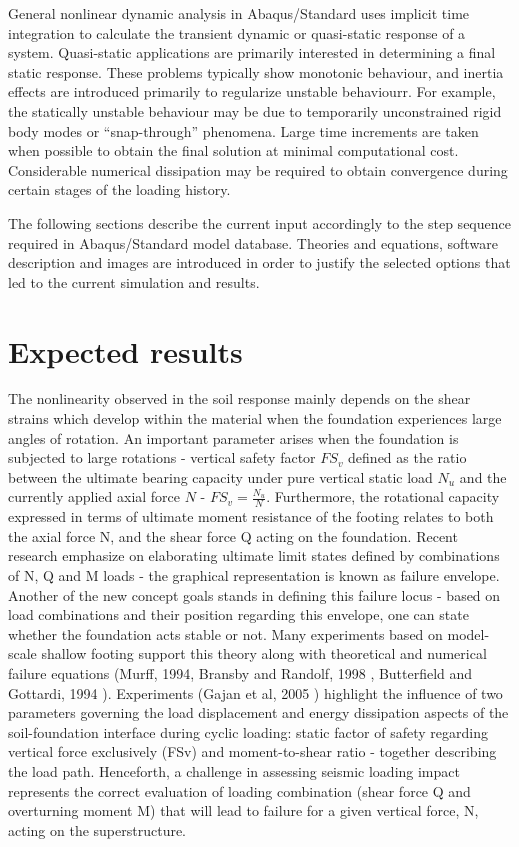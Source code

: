 \documentclass[12pt,a4paper]{report}
\begin{document}
General nonlinear dynamic analysis in Abaqus/Standard uses implicit time integration to calculate the transient dynamic or quasi-static response of a system. Quasi-static applications are primarily interested in determining a final static response. These problems typically show monotonic behaviour, and inertia effects are introduced primarily to regularize unstable behaviourr. For example, the statically unstable behaviour may be due to temporarily unconstrained rigid body modes or “snap-through” phenomena. Large time increments are taken when possible to obtain the final solution at minimal computational cost. Considerable numerical dissipation may be required to obtain convergence during certain stages of the loading history.

The following sections describe the current input accordingly to the step sequence required in Abaqus/Standard model database. Theories and equations, software description and images are introduced in order to justify the selected options that led to the current simulation and results.
\section{Expected results}
The nonlinearity observed in the soil response mainly depends on the shear strains which develop within the material when the foundation experiences large angles of rotation. An important parameter arises when the foundation is subjected to large rotations - vertical safety factor $FS_v$ defined as the ratio between the ultimate bearing capacity under pure vertical static load $N_u$ and the currently applied axial force $N$ - $FS_v = \frac{N_u}{N}$. Furthermore, the rotational capacity expressed in terms of ultimate moment resistance of the footing relates to both the axial force N, and the shear force Q acting on the foundation. Recent research emphasize on elaborating ultimate limit states defined by combinations of N, Q and M loads - the graphical representation is known as failure envelope. 
Another of the new concept goals stands in defining this failure locus - based on load combinations and their position regarding this envelope, one can state whether the foundation acts stable or not. Many experiments based on model-scale shallow footing support this theory along with theoretical and numerical failure equations (Murff, 1994, Bransby and Randolf, 1998 \cite{bransby1998combined}, Butterfield and Gottardi, 1994 \cite{gottardi1999plastic}). Experiments (Gajan et al, 2005 \cite{gajan2005centrifuge}) highlight the influence of two parameters governing the load displacement and energy dissipation aspects of the soil-foundation interface during cyclic loading: static factor of safety regarding vertical force exclusively (FSv) and moment-to-shear ratio - together describing the load path. Henceforth, a challenge in assessing seismic loading impact represents the correct evaluation of loading combination (shear force Q and overturning moment M) that will lead to failure for a given vertical force, N, acting on the superstructure.
\end{document}
